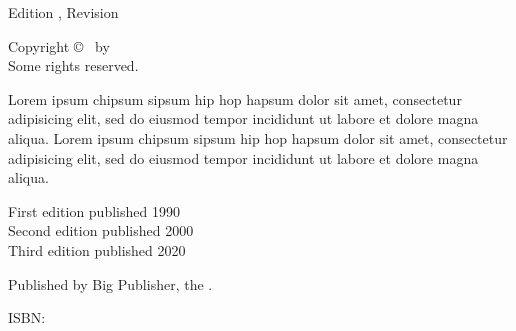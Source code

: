 
\clearpage

\begingroup
  \null\vfill\small

  \utitle\par
  Edition \uedition, Revision \urevision\par
  Copyright \copyright{} \udate\ by \uauthor\\
  Some rights reserved.\par

  Lorem ipsum chipsum sipsum hip hop hapsum dolor sit amet, consectetur adipisicing elit, sed do eiusmod tempor incididunt ut labore et dolore magna aliqua. Lorem ipsum chipsum sipsum hip hop hapsum dolor sit amet, consectetur adipisicing elit, sed do eiusmod tempor incididunt ut labore et dolore magna aliqua.\par

  First edition published 1990\\
  Second edition published 2000\\
  Third edition published 2020\par
  
  Published by Big Publisher,
  the \upublisher.\par
  ISBN: \uisbn\par

  \uwebsite\par
  \vspace*{10mm}
\endgroup




  


\clearpage